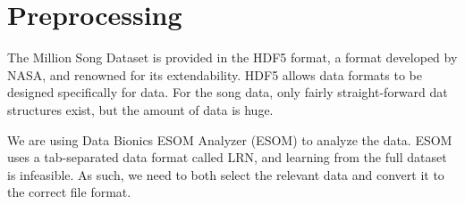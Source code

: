 \section{Preprocessing} %
\label{sec:preprocessing}

The Million Song Dataset is provided in the HDF5 format, a format developed by NASA, and renowned for its extendability. HDF5
allows data formats to be designed specifically for data. \citep{hdfgrp} For the song data, only fairly straight-forward dat
structures exist, but the amount of data is huge.

We are using Data Bionics ESOM Analyzer (ESOM) to analyze the data. ESOM uses a tab-separated data format called LRN, and learning
from the full dataset is infeasible. As such, we need to both select the relevant data and convert it to the correct file format.



